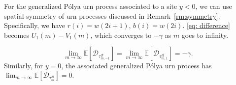 \documentclass[EJP]{ejpecp} %
\begin{document}
For the generalized P\'{o}lya urn process associated to a site $y<0$, we can use spatial symmetry of urn processes discussed in Remark~\ref{rm:symmetry}. Specifically, we have $r(i) = w(2i+1)$, $b(i) =w(2i)$. \eqref{eq: difference} becomes $U_1(m)-V_1(m)$, which converges to $-\gamma$ as $m$ goes to infinity.

\begin{equation}\label{eq: general expected drift}
	\lim_{m\to\infty}\mathbb{E}\left[ \mathscr{D}_{\tau^{\mathscr{B}}_{m,-1}} \right] = \lim_{m\to\infty}\mathbb{E}\left[ \mathscr{D}_{\tau^{\mathscr{R}}_{m,1}} \right] = -\gamma.
\end{equation}
Similarly, for $y=0$, the associated generalized P\'{o}lya urn process has 
$\lim_{m\to\infty}\mathbb{E}\left[ \mathscr{D}_{\tau^{\mathscr{B}}_m} \right] = 0.$
\end{document}
